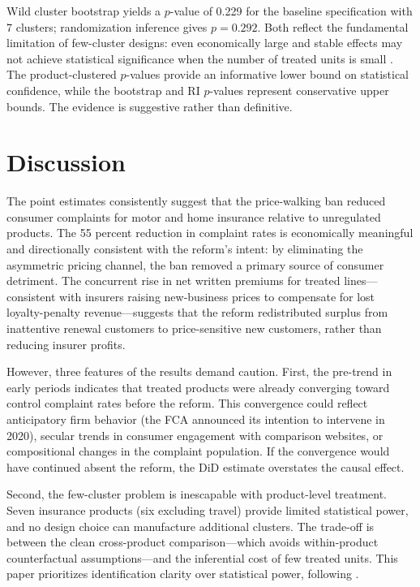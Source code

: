 \documentclass[12pt]{article}
\begin{document}
Wild cluster bootstrap yields a $p$-value of 0.229 for the baseline specification with 7 clusters; randomization inference gives $p = 0.292$. Both reflect the fundamental limitation of few-cluster designs: even economically large and stable effects may not achieve statistical significance when the number of treated units is small \citep{mackinnon2022wild}. The product-clustered $p$-values provide an informative lower bound on statistical confidence, while the bootstrap and RI $p$-values represent conservative upper bounds. The evidence is suggestive rather than definitive.




\section{Discussion}

The point estimates consistently suggest that the price-walking ban reduced consumer complaints for motor and home insurance relative to unregulated products. The 55 percent reduction in complaint rates is economically meaningful and directionally consistent with the reform's intent: by eliminating the asymmetric pricing channel, the ban removed a primary source of consumer detriment. The concurrent rise in net written premiums for treated lines---consistent with insurers raising new-business prices to compensate for lost loyalty-penalty revenue---suggests that the reform redistributed surplus from inattentive renewal customers to price-sensitive new customers, rather than reducing insurer profits.

However, three features of the results demand caution. First, the pre-trend in early periods indicates that treated products were already converging toward control complaint rates before the reform. This convergence could reflect anticipatory firm behavior (the FCA announced its intention to intervene in 2020), secular trends in consumer engagement with comparison websites, or compositional changes in the complaint population. If the convergence would have continued absent the reform, the DiD estimate overstates the causal effect.

Second, the few-cluster problem is inescapable with product-level treatment. Seven insurance products (six excluding travel) provide limited statistical power, and no design choice can manufacture additional clusters. The trade-off is between the clean cross-product comparison---which avoids within-product counterfactual assumptions---and the inferential cost of few treated units. This paper prioritizes identification clarity over statistical power, following \citet{conley2011inference}.
\end{document}
